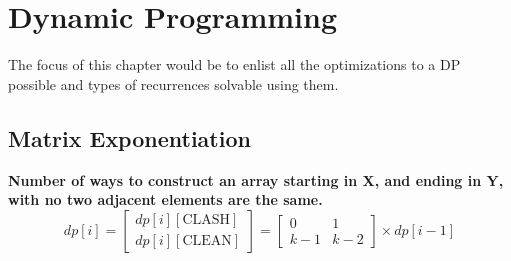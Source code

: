 \chapter{Dynamic Programming}

The focus of this chapter would be to enlist all the optimizations to a DP possible and types of recurrences solvable using them.



\section{Matrix Exponentiation}


\begin{example}{}
\textbf{Number of ways to construct an array starting in X, and ending in Y, with no two adjacent elements are the same.}
\begin{equation*}
    dp[i] = \begin{bmatrix} dp[i][\text{CLASH}] \\ dp[i][\text{CLEAN}] \end{bmatrix}
    = \begin{bmatrix} 0 & 1 \\ k-1 & k-2 \end{bmatrix} \times dp[i-1]
\end{equation*}
\end{example}
